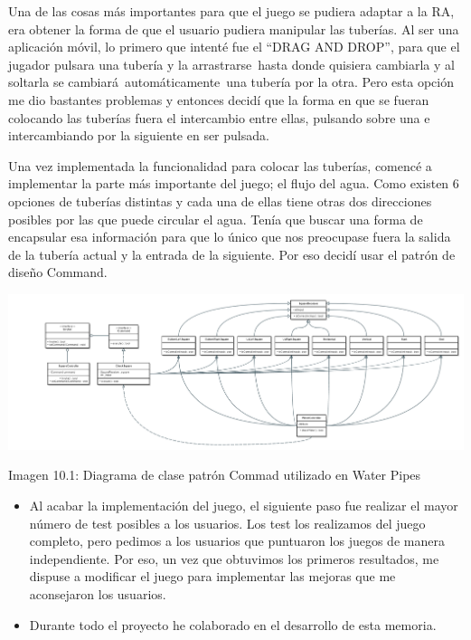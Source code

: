 \documentclass[]{article}
\begin{document}
Una de las cosas más importantes para que el juego se pudiera adaptar a
la RA, era obtener la forma de que el usuario pudiera manipular las
tuberías. Al ser una aplicación móvil, lo primero que intenté fue el
``DRAG AND DROP'', para que el jugador pulsara una tubería y la
arrastrarse~hasta donde quisiera cambiarla y al soltarla se
cambiará~automáticamente~una tubería por la otra. Pero esta opción me
dio bastantes problemas y entonces decidí que la forma en que se fueran
colocando las tuberías fuera el intercambio entre ellas, pulsando sobre
una e intercambiando por la siguiente en ser pulsada.

Una vez implementada la funcionalidad para colocar las tuberías, comencé
a implementar la parte más importante del juego; el flujo del agua. Como
existen 6 opciones de tuberías distintas y cada una de ellas tiene otras
dos direcciones posibles por las que puede circular el agua. Tenía que
buscar una forma de encapsular esa información para que lo único que nos
preocupase fuera la salida de la tubería actual y la entrada de la
siguiente. Por eso decidí usar el patrón de diseño Command.

\includegraphics{images/image06.png}

Imagen 10.1: Diagrama de clase patrón Commad utilizado en Water Pipes

\begin{itemize}
\itemsep1pt\parskip0pt
\item
  Al acabar la implementación del juego, el siguiente paso fue realizar
  el mayor número de test posibles a los usuarios. Los test los
  realizamos del juego completo, pero pedimos a los usuarios que
  puntuaron los juegos de manera independiente. Por eso, un vez que
  obtuvimos los primeros resultados, me dispuse a modificar el juego
  para implementar las mejoras que me aconsejaron los usuarios.
\end{itemize}

\begin{itemize}
\itemsep1pt\parskip0pt
\item
  Durante todo el proyecto he colaborado en el desarrollo de esta
  memoria.
\end{itemize}
\end{document}
